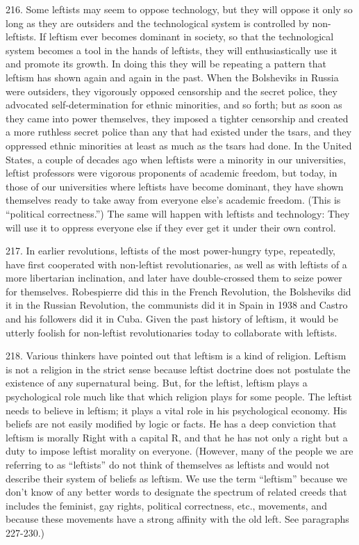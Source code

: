 \documentclass{article}
\begin{document}
216. Some leftists may seem to oppose technology, but they will oppose it only so long as they 
are outsiders and the technological system is controlled by non-leftists. If leftism ever becomes 
dominant in society, so that the technological system becomes a tool in the hands of leftists, they 
will enthusiastically use it and promote its growth. In doing this they will be repeating a pattern 
that leftism has shown again and again in the past. When the Bolsheviks in Russia were outsiders, 
they vigorously opposed censorship and the secret police, they advocated self-determination for 
ethnic minorities, and so forth; but as soon as they came into power themselves, they imposed a 
tighter censorship and created a more ruthless secret police than any that had existed under the 
tsars, and they oppressed ethnic minorities at least as much as the tsars had done. In the United 
States, a couple of decades ago when leftists were a minority in our universities, leftist professors 
were vigorous proponents of academic freedom, but today, in those of our universities where 
leftists have become dominant, they have shown themselves ready to take away from everyone 
else’s academic freedom. (This is “political correctness.”) The same will happen with leftists and 
technology: They will use it to oppress everyone else if they ever get it under their own control. \vspace{\baselineskip}

217. In earlier revolutions, leftists of the most power-hungry type, repeatedly, have first 
cooperated with non-leftist revolutionaries, as well as with leftists of a more libertarian inclination, 
and later have double-crossed them to seize power for themselves. Robespierre did this in the 
French Revolution, the Bolsheviks did it in the Russian Revolution, the communists did it in Spain 
in 1938 and Castro and his followers did it in Cuba. Given the past history of leftism, it would be 
utterly foolish for non-leftist revolutionaries today to collaborate with leftists. \vspace{\baselineskip}

218. Various thinkers have pointed out that leftism is a kind of religion. Leftism is not a religion 
in the strict sense because leftist doctrine does not postulate the existence of any supernatural 
being. But, for the leftist, leftism plays a psychological role much like that which religion plays 
for some people. The leftist needs to believe in leftism; it plays a vital role in his psychological 
economy. His beliefs are not easily modified by logic or facts. He has a deep conviction that 
leftism is morally Right with a capital R, and that he has not only a right but a duty to impose 
leftist morality on everyone. (However, many of the people we are referring to as “leftists” do not 
think of themselves as leftists and would not describe their system of beliefs as leftism. We use 
the term “leftism” because we don’t know of any better words to designate the spectrum of related 
creeds that includes the feminist, gay rights, political correctness, etc., movements, and because 
these movements have a strong affinity with the old left. See paragraphs 227-230.) \vspace{\baselineskip}
\end{document}
